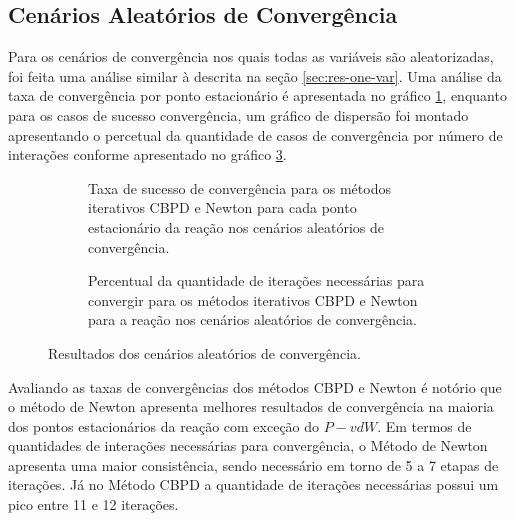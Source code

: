 \subsection{Cenários Aleatórios de Convergência}

Para os cenários de convergência nos quais todas as variáveis são aleatorizadas, foi feita uma análise similar à descrita na seção \ref{sec:res-one-var}. Uma análise da taxa de convergência por ponto estacionário é apresentada no gráfico \ref{fig:result-mult-var-conv-tax}, enquanto para os casos de sucesso convergência, um gráfico de dispersão foi montado apresentando o percetual da quantidade de casos de convergência por número de interações conforme apresentado no gráfico \ref{fig:result-mult-var-conv-metric}.

\begin{figure}
  \begin{subfigure}{.5\textwidth}
    \begin{center}
    
    \end{center}
    \caption{Taxa de sucesso de convergência para os métodos iterativos CBPD e Newton para cada ponto estacionário da reação  nos cenários aleatórios de convergência.}
    \label{fig:result-mult-var-conv-tax}
  \end{subfigure}%
  \begin{subfigure}{.5\textwidth}
    \begin{center}
    
    \end{center}
    \caption{Percentual da quantidade de iterações necessárias para convergir para os métodos iterativos CBPD e Newton para a reação  nos cenários aleatórios de convergência.}
    \label{fig:result-mult-var-conv-metric}
  \end{subfigure}
  \caption{Resultados dos cenários aleatórios de convergência.}
\end{figure}

Avaliando as taxas de convergências dos métodos CBPD e Newton é notório que o método de Newton apresenta melhores resultados de convergência na maioria dos pontos estacionários da reação com exceção do $P-vdW$. Em termos de quantidades de interações necessárias para convergência, o Método de Newton apresenta uma maior consistência, sendo necessário em torno de 5 a 7 etapas de iterações. Já no Método CBPD a quantidade de iterações necessárias possui um pico entre 11 e 12 iterações.
